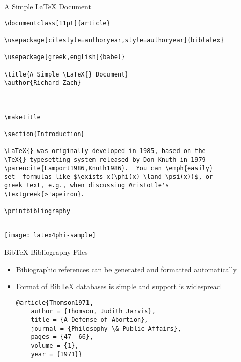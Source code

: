 \begin{frame}{A Simple \LaTeX{} Document}

\begin{verbatim}
\documentclass[11pt]{article}

\usepackage[citestyle=authoryear,style=authoryear]{biblatex}

\usepackage[greek,english]{babel}

\title{A Simple \LaTeX{} Document}
\author{Richard Zach}



\maketitle

\section{Introduction}

\LaTeX{} was originally developed in 1985, based on the 
\TeX{} typesetting system released by Don Knuth in 1979
\parencite{Lamport1986,Knuth1986}.  You can \emph{easily} 
set  formulas like $\exists x(\phi(x) \land \psi(x))$, or 
greek text, e.g., when discussing Aristotle's 
\textgreek{>'apeiron}.

\printbibliography


\end{verbatim}
\end{frame}

\begin{frame}

\texttt{[image: latex4phi-sample]}
\end{frame}

\begin{frame}[fragile]{Bib\TeX{} Bibliography Files}

\begin{itemize}
\item Bibiographic references can be generated and formatted automatically
\item Format of Bib\TeX{} databases is simple and support is widespread  
\begin{verbatim}
@article{Thomson1971,
    author = {Thomson, Judith Jarvis},
    title = {A Defense of Abortion},
    journal = {Philosophy \& Public Affairs},
    pages = {47--66},
    volume = {1},
    year = {1971}}
\end{verbatim}
\end{itemize}
\end{frame}

